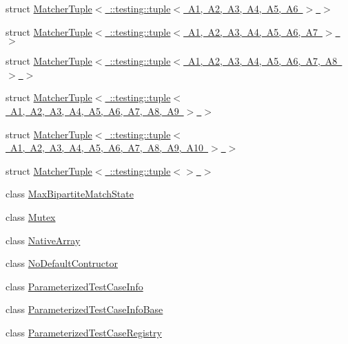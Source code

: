 \begin{DoxyCompactItemize}
\item 
struct \mbox{\hyperlink{structtesting_1_1internal_1_1_matcher_tuple_3_01_1_1testing_1_1tuple_3_01_a1_00_01_a2_00_01_a3_0fb935efcf1b84fbc4f177777ca3392dc}{Matcher\+Tuple$<$ \+::testing\+::tuple$<$ A1, A2, A3, A4, A5, A6 $>$ $>$}}
\item 
struct \mbox{\hyperlink{structtesting_1_1internal_1_1_matcher_tuple_3_01_1_1testing_1_1tuple_3_01_a1_00_01_a2_00_01_a3_0064798126035aa0d3ca935c3449bf0c1}{Matcher\+Tuple$<$ \+::testing\+::tuple$<$ A1, A2, A3, A4, A5, A6, A7 $>$ $>$}}
\item 
struct \mbox{\hyperlink{structtesting_1_1internal_1_1_matcher_tuple_3_01_1_1testing_1_1tuple_3_01_a1_00_01_a2_00_01_a3_0d8930d50f28e62c202d0bf6b34d01eac}{Matcher\+Tuple$<$ \+::testing\+::tuple$<$ A1, A2, A3, A4, A5, A6, A7, A8 $>$ $>$}}
\item 
struct \mbox{\hyperlink{structtesting_1_1internal_1_1_matcher_tuple_3_01_1_1testing_1_1tuple_3_01_a1_00_01_a2_00_01_a3_05ce0d9708ffc0cc1f9fec180f9f8202e}{Matcher\+Tuple$<$ \+::testing\+::tuple$<$ A1, A2, A3, A4, A5, A6, A7, A8, A9 $>$ $>$}}
\item 
struct \mbox{\hyperlink{structtesting_1_1internal_1_1_matcher_tuple_3_01_1_1testing_1_1tuple_3_01_a1_00_01_a2_00_01_a3_0842d32b3c1d00aa4e42fe38fbc4fa689}{Matcher\+Tuple$<$ \+::testing\+::tuple$<$ A1, A2, A3, A4, A5, A6, A7, A8, A9, A10 $>$ $>$}}
\item 
struct \mbox{\hyperlink{structtesting_1_1internal_1_1_matcher_tuple_3_01_1_1testing_1_1tuple_3_4_01_4}{Matcher\+Tuple$<$ \+::testing\+::tuple$<$$>$ $>$}}
\item 
class \mbox{\hyperlink{classtesting_1_1internal_1_1_max_bipartite_match_state}{Max\+Bipartite\+Match\+State}}
\item 
class \mbox{\hyperlink{classtesting_1_1internal_1_1_mutex}{Mutex}}
\item 
class \mbox{\hyperlink{classtesting_1_1internal_1_1_native_array}{Native\+Array}}
\item 
class \mbox{\hyperlink{classtesting_1_1internal_1_1_no_default_contructor}{No\+Default\+Contructor}}
\item 
class \mbox{\hyperlink{classtesting_1_1internal_1_1_parameterized_test_case_info}{Parameterized\+Test\+Case\+Info}}
\item 
class \mbox{\hyperlink{classtesting_1_1internal_1_1_parameterized_test_case_info_base}{Parameterized\+Test\+Case\+Info\+Base}}
\item 
class \mbox{\hyperlink{classtesting_1_1internal_1_1_parameterized_test_case_registry}{Parameterized\+Test\+Case\+Registry}}

\end{DoxyCompactItemize}
